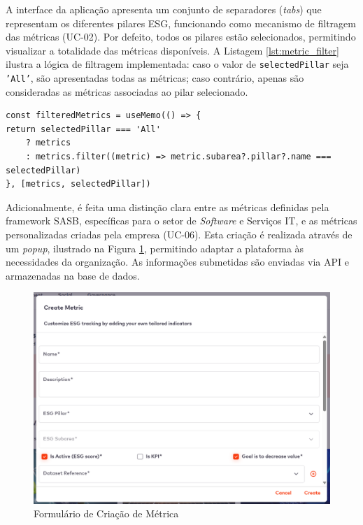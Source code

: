 A interface da aplicação apresenta um conjunto de separadores (\textit{tabs}) que representam os diferentes pilares ESG, funcionando como mecanismo de filtragem das métricas (UC-02). Por defeito, todos os pilares estão selecionados, permitindo visualizar a totalidade das métricas disponíveis. A Listagem \ref{lst:metric_filter} ilustra a lógica de filtragem implementada: caso o valor de \texttt{selectedPillar} seja \texttt{'All'}, são apresentadas todas as métricas; caso contrário, apenas são consideradas as métricas associadas ao pilar selecionado.

\begin{lstlisting}[style=customts, caption={Excerto de Código com Filtragem das Métricas}, label={lst:metric_filter}]
const filteredMetrics = useMemo(() => {
return selectedPillar === 'All'
    ? metrics
    : metrics.filter((metric) => metric.subarea?.pillar?.name === selectedPillar)
}, [metrics, selectedPillar])
\end{lstlisting}

Adicionalmente, é feita uma distinção clara entre as métricas definidas pela framework \gls{SASB}, específicas para o setor de \textit{Software} e Serviços IT, e as métricas personalizadas criadas pela empresa (UC-06). Esta criação é realizada através de um \textit{popup}, ilustrado na Figura \ref{fig:metric_creation}, permitindo adaptar a plataforma às necessidades da organização. As informações submetidas são enviadas via API e armazenadas na base de dados.

\begin{figure}[H]
    \centering
    \includegraphics[width=5in,keepaspectratio]{frontmatter/assets/platform_prints/metrics/metric_creation.png}
    \caption{Formulário de Criação de Métrica}
    \label{fig:metric_creation}
\end{figure}

